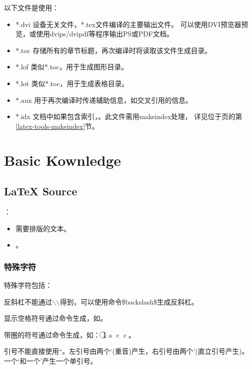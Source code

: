 \documentclass[a4paper,11pt,oneside,openany]{book}
\begin{document}
\begin{CJK*}{GBK}{song}
以下文件是使用：
\begin{itemize}
\item *.dvi   设备无关文件，*.tex文件编译的主要输出文件。
                可以使用DVI预览器预览，或使用dvips/dvipdf等程序输出PS或PDF文档。
\item *.toc   存储所有的章节标题，再次编译时将读取该文件生成目录。
\item *.lof   类似*.toc，用于生成图形目录。
\item *.lot   类似*.toc，用于生成表格目录。
\item *.aux   用于再次编译时传递辅助信息，如交叉引用的信息。
\item *.idx   文档中如果包含索引，。此文件需用makeindex处理，
                详见位于\pageref{latex-tools-makeindex}页的第\ref{latex-tools-makeindex}节。
\end{itemize}


\section{Basic Kownledge}

\subsection{\LaTeX{} Source}
：
\begin{itemize}
\item 需要排版的文本。
\item {}。
\end{itemize}

\subsubsection{特殊字符}
特殊字符包括：
\framebox{\# \$ \% \^{} \& \_ \{ \} \ {} } \par

反斜杠不能通过$\backslash$$\backslash$得到，可以使用命令\$backslash\$生成反斜杠。

显示空格符号通过命令生成，如\textvisiblespace。

带圈的符号通过命令生成，如：
\textcircled{\scriptsize 1}
\textcircled{\scriptsize a}
\textcircled{\scriptsize c}
\textcircled{c}。

引号不能直接使用“。左引号由两个`(重音)产生，右引号由两个'(直立引号产生)。一个`和一个'产生一个单引号。


\end{CJK*}
\end{document}
